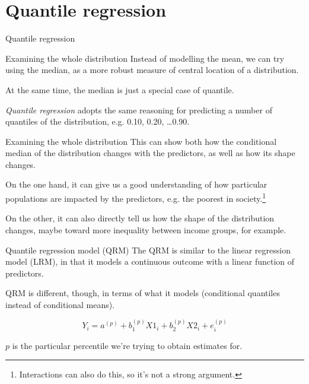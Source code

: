 \documentclass[12pt,english,pdf,xcolor=dvipsnames,aspectratio=169,handout]{beamer}\usepackage[]{graphicx}\usepackage[]{xcolor}
\begin{document}
\section{Quantile regression}

\begin{frame}
\begin{center}
    \Huge Quantile regression
\end{center}
\end{frame}


\begin{frame}{Examining the whole distribution}
Instead of modelling the mean, we can try using the median, as a more robust measure of central location of a distribution.\bigskip

At the same time, the median is just a special case of quantile.\bigskip

\textit{Quantile regression} adopts the same reasoning for predicting a number of quantiles of the distribution, e.g. 0.10, 0.20, \dots 0.90.

\end{frame}



\begin{frame}{Examining the whole distribution}
This can show both how the conditional median of the distribution changes with the predictors, as well as how its shape changes.\bigskip

On the one hand, it can give us a good understanding of how particular populations are impacted by the predictors, e.g. the poorest in society.\footnote{Interactions can also do this, so it's not a strong argument.}\bigskip

On the other, it can also directly tell us how the shape of the distribution changes, maybe toward more inequality between income groups, for example.

\end{frame}



\begin{frame}{Quantile regression model (QRM)}
The QRM is similar to the linear regression model (LRM), in that it models a continuous outcome with a linear function of predictors.\bigskip

QRM is different, though, in terms of what it models (conditional quantiles instead of conditional means).\bigskip

\begin{equation}
Y_i = a^{(p)} + b_1^{(p)}X1_i + b_2^{(p)}X2_i + e_i^{(p)}
\end{equation}

$p$ is the particular percentile we're trying to obtain estimates for.

\end{frame}
\end{document}
